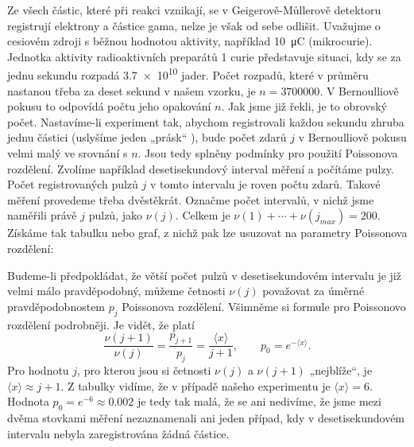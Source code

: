 \begin{example}
  Ze všech částic, které při reakci vznikají, se v Geigerově-Můllerově detektoru registrují 
  elektrony a částice gama, nelze je však od sebe odlišit. Uvažujme o cesiovém zdroji s běžnou 
  hodnotou aktivity, například \SI{10}{\micro\coulomb} (mikrocurie). Jednotka aktivity 
  radioaktivních preparátů \num{1} curie představuje situaci, kdy se za jednu sekundu rozpadá 
  \num{3.7e10} jader. Počet rozpadů, které v průměru nastanou třeba za deset sekund v našem vzorku, 
  je \(n = \num{3700000}\). V Bernoulliově pokusu to odpovídá počtu jeho opakování \(n\). Jak jsme 
  již řekli, je to obrovský počet. Nastavíme-li experiment tak, abychom registrovali každou sekundu 
  zhruba jednu částici (uslyšíme jeden „prásk“ ), bude počet zdarů \(j\) v Bernoulliově pokusu 
  velmi malý ve srovnání s \(n\). Jsou tedy splněny podmínky pro použití Poissonova rozdělení. 
  Zvolíme například desetisekundový interval měření a počítáme pulzy. Počet registrovaných pulzů 
  \(j\) v tomto intervalu je roven počtu zdarů. Takové měření provedeme třeba dvěstěkrát.
  Označme počet intervalů, v nichž jsme naměřili právě \(j\) pulzů, jako \(\nu(j)\). Celkem je 
  \(\nu(1) + \cdots + \nu(j_{max}) = \num{200}\). Získáme tak tabulku nebo graf, z nichž pak lze 
  usuzovat na parametry Poissonova rozdělení:
  \begin{table}[ht!]
    \centering
  \end{table}
  Budeme-li předpokládat, že větší počet pulzů v desetisekundovém intervalu je již velmi málo 
  pravděpodobný, můžeme četnosti \(\nu(j)\) považovat za úměrné pravděpodobnostem \(p_j\) 
  Poissonova rozdělení. Všimněme si formule pro Poissonovo rozdělení podrobněji. Je vidět, že platí
  \begin{equation*}
    \dfrac{\nu(j + 1)}{\nu(j)} = \dfrac{p_{j+1}}{p_{j}} = \dfrac{\langle x \rangle}{j + 1},
    \qquad p_0 = e^{-\langle x \rangle}.
  \end{equation*}
  Pro hodnotu \(j\), pro kterou jsou si četnosti \(\nu(j)\) a \(\nu(j + 1)\) „nejblíže“, je 
  \(\langle x \rangle \approx j + 1\). Z tabulky vidíme, že v případě našeho experimentu je 
  \(\langle x \rangle = 6\). Hodnota \(p_0 = e^{-6} \approx \num{0.002}\) je tedy tak malá, že se 
  ani nedivíme, že jsme mezi dvěma stovkami měření nezaznamenali ani jeden případ, kdy v 
  desetisekundovém intervalu nebyla zaregistrována žádná částice.
  

\end{example}
